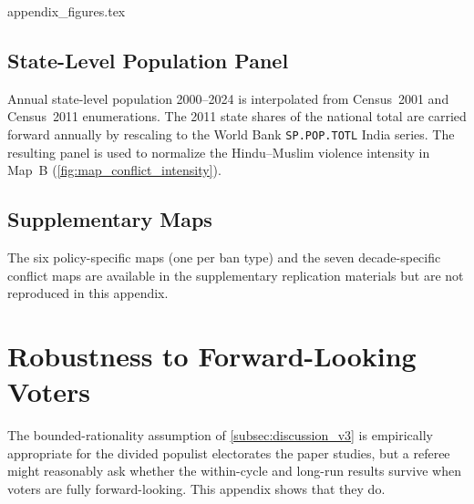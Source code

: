 \documentclass[11pt,twoside]{extarticle}
\begin{document}
{appendix_figures.tex}

\subsection{State-Level Population Panel} \label{app:population}

Annual state-level population 2000--2024 is interpolated from
Census~2001 and Census~2011 enumerations. The 2011 state shares of the
national total are carried forward annually by rescaling to the World Bank
\texttt{SP.POP.TOTL} India series. The resulting panel is used to
normalize the Hindu--Muslim violence intensity in Map~B
(\autoref{fig:map_conflict_intensity}).

\subsection{Supplementary Maps} \label{app:supplementary_maps}

The six policy-specific maps (one per ban type) and the seven decade-specific
conflict maps are available in the supplementary replication materials but are not reproduced in this appendix.




\section{Robustness to Forward-Looking Voters}\label{oa:robust_fwd}

The bounded-rationality assumption of \autoref{subsec:discussion_v3} is empirically appropriate for the divided populist electorates the paper studies, but a referee might reasonably ask whether the within-cycle and long-run results survive when voters are fully forward-looking. This appendix shows that they do.
\end{document}
